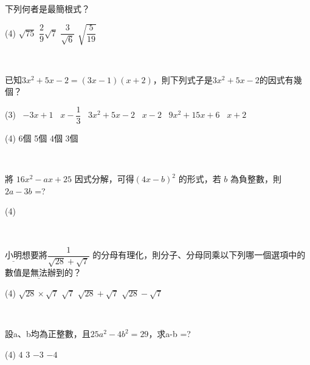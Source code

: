\documentclass
[answers]
{exam}
\theoremstyle{definition}
\newif\ifyr\yrfalse %
\newcommand{\yr}[1]{\ifyr\relax\else #1\fi}
\newif\ifsho\shofalse %
\newcommand{\sho}[1]{\ifsho\relax\else\rightline{【#1】}\fi}
\begin{document}
\begin{questions}


\question
下列何者是最簡根式？
\begin{tasks}(4)
	\task $\sqrt{75}$
	\task $\dfrac{2}{9}\sqrt{7}$
	\task $\dfrac{3}{\sqrt{6}}$
	\task $\sqrt{\dfrac{5}{19}}$
\end{tasks}
\begin{solution}~\\
	
\end{solution}


\question
已知$3x^2 + 5x -2 =(3x-1)(x+2)$，則下列式子是$3x^2+5x-2$的因式有幾個？
\begin{tasks}(3)
	\task[(甲)] \ $-3x+1$
	\task[(乙)] \ $x-\dfrac{1}{3}$
	\task[(丙)] \ $3x^2+5x-2$
	\task[(丁)] \ $x-2$
	\task[(戊)] \ $9x^2+15x+6$
	\task[(己)] \ $x+2$
\end{tasks}
\begin{tasks}(4)
	\task 6個
	\task 5個
	\task 4個
	\task 3個
\end{tasks}
\begin{solution}~\\
	
\end{solution}

\question
將 $16x^2-ax+25$ 因式分解，可得$(4x-b)^2$ 的形式，若 $b$ 為負整數，則 $2a-3b$ =?
\begin{tasks}(4)
\end{tasks}
\begin{solution}~\\
	
\end{solution}

\question
$\underline{小明}$想要將$\dfrac{1}{\sqrt{28}+\sqrt{7}}$ 的分母有理化，則分子、分母同乘以下列哪一個選項中的數值是$\underline{無法}$辦到的？
\begin{tasks}(4)
	\task $\sqrt{28}\times\sqrt{7}$
	\task $\sqrt{7}$
	\task $\sqrt{28}+\sqrt{7}$
	\task $\sqrt{28}-\sqrt{7}$
\end{tasks}
\begin{solution}~\\
	
\end{solution}


\question
設a、b均為正整數，且$25a^2-4b^2=29$，求a-b =?

\begin{tasks}(4)
	\task $4$
	\task $3$
	\task $-3$
	\task $-4$
\end{tasks}


\end{questions}
\end{document}
